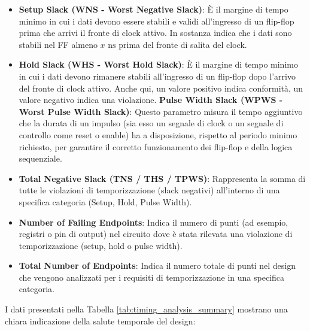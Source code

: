\documentclass{article}
\begin{document}
\begin{itemize}
    \item \textbf{Setup Slack (WNS - Worst Negative Slack)}: È il margine di tempo minimo in cui i dati devono essere stabili e validi all'ingresso di un flip-flop prima che arrivi il fronte di clock attivo. 
    In sostanza indica che i dati sono stabili nel FF almeno $x \text{ ns}$ prima del fronte di salita del clock.
    \item \textbf{Hold Slack (WHS - Worst Hold Slack)}: È il margine di tempo minimo in cui i dati devono rimanere stabili all'ingresso di un flip-flop dopo l'arrivo del fronte di clock attivo. Anche qui, un valore positivo indica conformità, un valore negativo indica una violazione.
    \textbf{Pulse Width Slack (WPWS - Worst Pulse Width Slack)}: Questo parametro misura il tempo aggiuntivo che la durata di un impulso (sia esso un segnale di clock o un segnale di controllo come reset o enable) ha a disposizione, rispetto al periodo minimo richiesto, per garantire il corretto funzionamento dei flip-flop e della logica sequenziale.
    \item \textbf{Total Negative Slack (TNS / THS / TPWS)}: Rappresenta la somma di tutte le violazioni di temporizzazione (slack negativi) all'interno di una specifica categoria (Setup, Hold, Pulse Width).
    \item \textbf{Number of Failing Endpoints}: Indica il numero di punti (ad esempio, registri o pin di output) nel circuito dove è stata rilevata una violazione di temporizzazione (setup, hold o pulse width).
    \item \textbf{Total Number of Endpoints}: Indica il numero totale di punti nel design che vengono analizzati per i requisiti di temporizzazione in una specifica categoria.
\end{itemize}

\noindent I dati presentati nella Tabella \ref{tab:timing_analysis_summary} mostrano una chiara indicazione della salute temporale del design:
\end{document}
